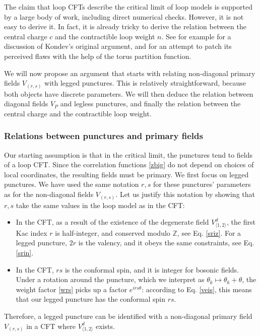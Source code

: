 \documentclass[12pt, a4paper]{article}
\begin{document}
The claim that loop CFTs describe the critical limit of loop models is supported by a large body of work, including direct numerical checks. However, it is not easy to derive it. In fact, it is already tricky to derive the relation between the central charge $c$ and the contractible loop weight $n$. See for example \cite[Appendix A]{grz18} for a discussion of Kondev's original argument, and for an attempt to patch its perceived flaws with the help of the torus partition function. 

We will now propose an argument that starts with relating non-diagonal primary fields $V_{(r,s)}$ with legged punctures. This is relatively straightforward, because both objects have discrete parameters. We will then deduce the relation between diagonal fields $V_P$ and legless punctures, and finally the relation between the central charge and the contractible loop weight. 

\subsubsection{Relations between punctures and primary fields}

Our starting assumption is that in the critical limit, the punctures tend to fields of a loop CFT.
Since the correlation functions \eqref{zbig} do not depend on choices of local coordinates, the resulting fields must be primary. We first focus on legged punctures. We have used the same notation $r,s$ for these punctures' parameters as for the non-diagonal fields $V_{(r,s)}$. Let us justify this notation by showing that $r,s$ take the same values in the loop model as in the CFT:
\begin{itemize}
 \item In the CFT, as a result of the existence of the degenerate field $V^d_{\langle 1,2\rangle}$, the first Kac index $r$ is half-integer, and conserved modulo $\mathbb{Z}$, see Eq. \eqref{sriz}. For a legged puncture, $2r$ is the valency, and it obeys the same constraints, see Eq. \eqref{srin}.
 \item In the CFT, $rs$ is the conformal spin, and it is integer for bosonic fields. Under a rotation around the puncture, which we interpret as $\theta_k\mapsto \theta_k + \theta$, the weight factor \eqref{wrs} picks up a factor $e^{irs\theta}$: according to Eq. \eqref{veis}, this means that our legged puncture has the conformal spin $rs$. 
\end{itemize}
Therefore, a legged puncture can be identified with a non-diagonal primary field $V_{(r,s)}$ in a CFT where $V^d_{\langle 1,2\rangle}$ exists. 
\end{document}
